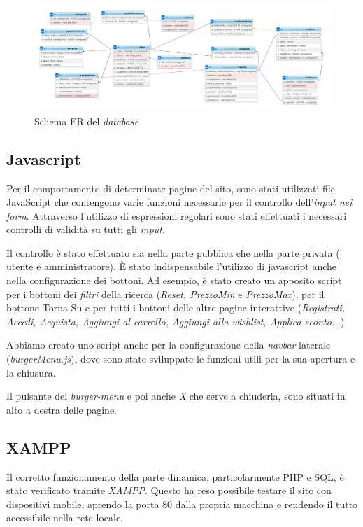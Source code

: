 \begin{figure}[h]
	\centering
	\includegraphics[scale=0.4]{images/er_db}
	\caption{Schema ER del \textit{database}}
\end{figure}

\subsection{Javascript}
Per il comportamento di determinate pagine del sito, sono stati utilizzati file JavaScript che contengono varie funzioni necessarie per il controllo dell’\textit{input nei form}. Attraverso l’utilizzo di espressioni regolari sono stati effettuati i necessari controlli di validità su tutti gli \textit{input}.

Il controllo è stato effettuato sia nella parte pubblica che nella parte privata ( utente e amministratore). È stato indispensabile l’utilizzo di javascript anche nella configurazione dei bottoni. Ad esempio, è stato creato un apposito script per i bottoni dei \textit{filtri} della ricerca (\textit{Reset, PrezzoMin} e \textit{PrezzoMax}), per il bottone Torna Su e per tutti i bottoni delle altre pagine interattive (\textit{Registrati, Accedi, Acquista, Aggiungi al carrello, Aggiungi alla wishlist, Applica sconto...})

Abbiamo creato uno script anche per la configurazione della \textit{navbar} laterale (\textit{burgerMenu.js}), dove sono state sviluppate le funzioni utili per la sua apertura e la chiusura.

Il pulsante del \textit{burger-menu} e poi anche \textit{X} che serve a chiuderla, sono situati in alto a destra delle pagine.

\subsection{XAMPP}
Il corretto funzionamento della parte dinamica, particolarmente PHP e SQL, è stato verificato tramite \textit{XAMPP}. Questo ha reso possibile testare il sito con dispositivi mobile, aprendo la porta 80 dalla propria macchina e rendendo il tutto accessibile nella rete locale.

